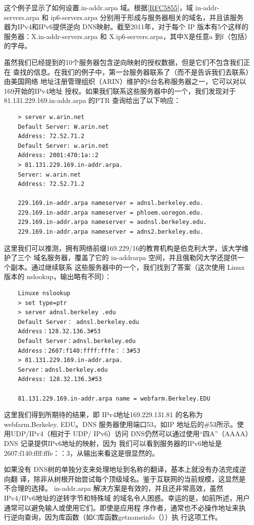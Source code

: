 这个例子显示了如何设置.in-addr.arpa
域。根据\href{https://www.rfc-editor.org/rfc/rfc5855}{[RFC5855]}，域
in-addr-servers.arpa 和
ip6-servers.arpa 分别用于形成与服务器相关的域名，并且该服务器为IPv4和IPv6提供逆向
DNS映射。截至2011年，对于每个 IP 版本有5个这样的服务器：X.in-addr-servers.arpa 和
X.ip6-servers.arpa，其中X是任意a 到f（包括）的字母。

虽然我们已经提到的10个服务器包含逆向映射的授权数据，但是它们不包含我们正在
查找的信息。在我们的例子中，第一台服务器联系了（而不是告诉我们去联系）由美国网络
地址注册管理组织（ARIN）维护的8台名称服务器之一，它可以对以 169开始的IPv4地址
授权。如果我们联系这些服务器中的一个，我们发现对于81.131.229.169.in-addr.arpa 的PTR
查询给出了以下响应：
\begin{verbatim}
    > server w.arin.net
    Default Server: W.arin.net
    Address: 72.52.71.2
    Default Server: w.arin.net
    Address: 2001:470:1a::2
    > 81.131.229.169.in-addr.arpa.
    Server: w.arin.net
    Address: 72.52.71.2

    229.169.in-addr.arpa nameserver = adnsl.berkeley.edu.
    229.169.in-addr.arpa nameserver = phloem.uoregon.edu.
    229.169.in-addr.arpa nameserver = aodnsl.berkeley.edu.
    229.169.in-addr.arpa nameserver = adns2.berkeley.edu.
\end{verbatim}

这里我们可以推测，拥有网络前缀169.229/16的教育机构是伯克利大学，该大学维护了三个
域名服务器，覆盖了它的 in-addrarpa 空间，并且俄勒冈大学还提供一个副本。通过继续联系
这些服务器中的一个，我们找到了答案（这次使用 Linux版本的 nslookup，输出略有不同）：

\begin{verbatim}
    Linuxe nslookup
    > set type=ptr
    > server adnsl.berkeley .edu
    Default Server： adnsl.berkeley.edu
    Address：128.32.136.3#53
    Default Server：adnsl.berkeley.edu
    Address：2607:f140:ffff:fffe：：3#53
    > 81.131.229.169.in-addr.arpa.
    Server：adnsl.berkeley.edu
    Address: 128.32.136.3#53

    81.131.229.169.in-addr.arpa name = webfarm.Berkeley.EDU
\end{verbatim}

这里我们得到所期待的结果，即 IPv4地址169.229.131.81 的名称为 webfarm.Berkeley.
EDU。DNS 服务器使用端口53，如IP 地址后的\#53所示。使用UDP/IPv4（相对于 UDP/
IPv6）访问 DNS仍然可以通过使用“四A”（AAAA）DNS 记录提供IPv6地址的映射，因为
我们可以看到服务器的IPv6地址是 2607:f140:ffff:fffe：：3，从输出来看这是很显然的。

如果没有 DNS树的单独分支来处理地址到名称的翻译，基本上就没有办法完成逆向翻
译，除非从树根开始尝试每个顶级域名。鉴于互联网的当前规模，这显然是不合理的选择。
in-addr.arpa 解决方案是有效的，并且还非常高效，虽然IPv4/IPv6地址的逆转字节和特殊域
的域名令人困惑。幸运的是，如前所述，用户通常可以避免输人或使用它们。即使是应用程
序作者，通常也不必操作地址来执行逆向查询，因为库函数（如C库函数getnameinfo（））执
行这项工作。

